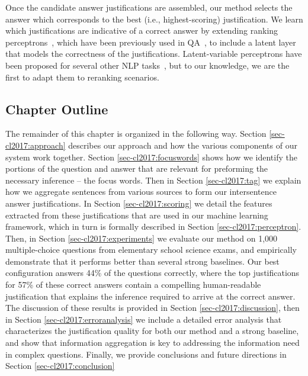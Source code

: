 Once the candidate answer justifications are assembled, our method selects the answer which corresponds to the best (i.e., highest-scoring) justification.  We learn which justifications are indicative of a correct answer by extending ranking perceptrons~\citep{Shen:Joshi:2005}, which have been previously used in QA~\citep{Surdeanu:11}, to include a latent layer that models the correctness of the justifications. Latent-variable perceptrons have been proposed for several other NLP tasks~\citep{liang2006end,zettlemoyer2007online,sun2009latent,hoffmann2011knowledge,fernandes2012latent,bjorkelund2014learning}, but to our knowledge, we are the first to adapt them to reranking scenarios. 

\subsection{Chapter Outline}

The remainder of this chapter is organized in the following way.  Section \ref{sec-cl2017:approach} describes our approach and how the various components of our system work together.  Section \ref{sec-cl2017:focuswords} shows how we identify the portions of the question and answer that are relevant for preforming the necessary inference -- the focus words.  Then in Section \ref{sec-cl2017:tag} we explain how we aggregate sentences from various sources to form our intersentence answer justifications.  In Section \ref{sec-cl2017:scoring} we detail the features extracted from these justifications that are used in our machine learning framework, which in turn is formally described in Section \ref{sec-cl2017:perceptron}.  
Then, in Section \ref{sec-cl2017:experiments} we evaluate our method on 1,000 multiple-choice questions from elementary school science exams, and empirically demonstrate that it performs better than several strong baselines.%
Our best configuration answers 44\% of the questions correctly, where the top justifications for 57\% of these correct answers contain a compelling human-readable justification that explains the inference required to arrive at the correct answer.  
The discussion of these results is provided in Section \ref{sec-cl2017:discussion}, then in Section \ref{sec-cl2017:erroranalysis}
we include a detailed error analysis that characterizes the justification quality for both our method and a strong baseline, and show that information aggregation is key to addressing the information need in complex questions.  Finally, we provide conclusions and future directions in Section \ref{sec-cl2017:conclusion}


